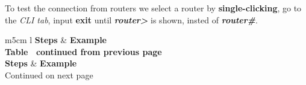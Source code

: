 \documentclass[11pt,a4paper]{report}
\begin{document}
        To test the connection from routers we select a router by \textbf{single-clicking}, go to the \textit{CLI tab}, input \textbf{exit} until \textbf{\textit{router>}} is shown, insted of \textbf{\textit{router\#}}.

        \begin{flushleft}
                \begin{center}
                    \begin{longtable}{ m{5cm} l }
                        \textbf{Steps} & \textbf{Example} \\
                        \hline
                        \endfirsthead
                        {{\bfseries Table \thetable\ continued from previous page}} \\
                        \textbf{Steps} & \textbf{Example} \\
                        \hline
                        \endhead
                        \hline Continued on next page \\
                        \endfoot
                        \endlastfoot


\end{longtable}
\end{center}
\end{flushleft}
\end{document}
